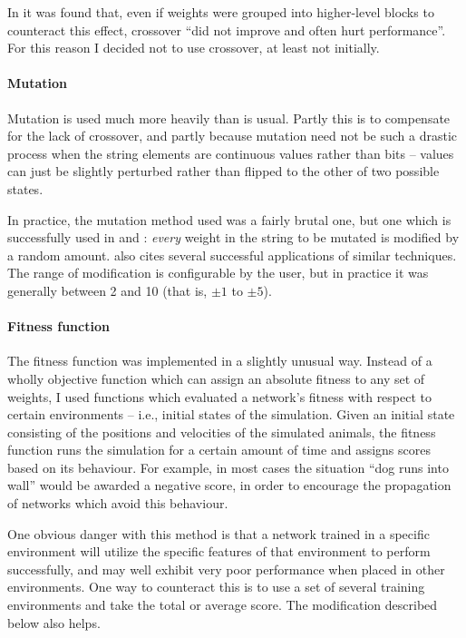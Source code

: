 \documentclass[a4paper]{report}
\begin{document}
In \cite{meeden96} it was found that, even if weights were grouped
into higher-level blocks to counteract this effect, crossover ``did
not improve and often hurt performance''. For this reason I decided
not to use crossover, at least not initially.

\paragraph{Mutation}
Mutation is used much more heavily than is usual. Partly this is
to compensate for the lack of crossover, and partly because
mutation need not be such a drastic process when the string elements
are continuous values rather than bits -- values can just be slightly
perturbed rather than flipped to the other of two possible states.

In practice, the mutation method used was a fairly brutal one, but one
which is successfully used in \cite{meeden96} and \cite{fogel98}:
\emph{every} weight in the string to be mutated is modified by a
random amount. \cite{yao99} also cites several successful applications
of similar techniques.  The range of modification is configurable by
the user, but in practice it was generally between 2 and 10 (that is,
$\pm 1$ to $\pm 5$).

\paragraph{Fitness function}
The fitness function was implemented in a slightly unusual way.
Instead of a wholly objective function which can assign an absolute
fitness to any set of weights, I used functions which evaluated a
network's fitness with respect to certain environments -- i.e., initial
states of the simulation. Given an initial state consisting of the
positions and velocities of the simulated animals, the fitness
function runs the simulation for a certain amount of time and assigns
scores based on its behaviour. For example, in most cases the
situation ``dog runs into wall'' would be awarded a negative score, in
order to encourage the propagation of networks which avoid this
behaviour.

One obvious danger with this method is that a network trained in a
specific environment will utilize the specific features of that
environment to perform successfully, and may well exhibit very poor
performance when placed in other environments. One way to counteract
this is to use a set of several training environments and take the
total or average score. The modification described below also helps.
\end{document}
